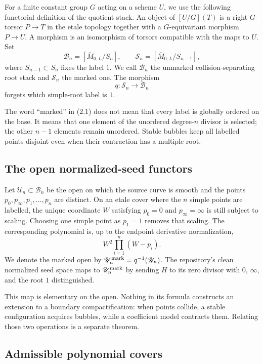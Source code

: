 \documentclass[11pt]{article}
\newcommand{\ol}{\overline}
\begin{document}
For a finite constant group $G$ acting on a scheme $U$, we use the following
functorial definition of the quotient stack.  An object of $[U/G](T)$ is a
right $G$-torsor $P\to T$ in the etale topology together with a
$G$-equivariant morphism $P\to U$.  A morphism is an isomorphism of torsors
compatible with the maps to $U$.  Set
\[
 \mathscr B_n=[\ol M_{0,L}/S_n],\qquad
 \mathscr S_n=[\ol M_{0,L}/S_{n-1}],                 \tag{2.1}
\]
where $S_{n-1}\subset S_n$ fixes the label $1$.  We call $\mathscr B_n$ the
unmarked collision-separating root stack and $\mathscr S_n$ the marked one.
The morphism
\[
 q:\mathscr S_n\longrightarrow\mathscr B_n           \tag{2.2}
\]
forgets which simple-root label is $1$.

The word ``marked'' in (2.1) does not mean that every label is globally
ordered on the base.  It means that one element of the unordered degree-$n$
divisor is selected; the other $n-1$ elements remain unordered.  Stable
bubbles keep all labelled points disjoint even when their contraction has a
multiple root.

\subsection{The open normalized-seed functors}

Let $\mathscr U_n\subset\mathscr B_n$ be the open on which the source curve
is smooth and the points $p_0,p_\infty,p_1,\ldots,p_n$ are distinct.  On an
etale cover where the $n$ simple points are labelled, the unique coordinate
$W$ satisfying $p_0=0$ and $p_\infty=\infty$ is still subject to scaling.
Choosing one simple point as $p_1=1$ removes that scaling.  The corresponding
polynomial is, up to the endpoint derivative normalization,
\[
 W^2\prod_{i=1}^{n}(W-p_i).
\]
We denote the marked open by $\mathscr U_n^{\rm mark}=q^{-1}(\mathscr U_n)$.
The repository's clean normalized seed space maps to
$\mathscr U_n^{\rm mark}$ by sending $H$ to its zero divisor with $0$,
$\infty$, and the root $1$ distinguished.

This map is elementary on the open.  Nothing in its formula constructs an
extension to a boundary compactification: when points collide, a stable
configuration acquires bubbles, while a coefficient model contracts them.
Relating those two operations is a separate theorem.

\subsection{Admissible polynomial covers}
\end{document}
